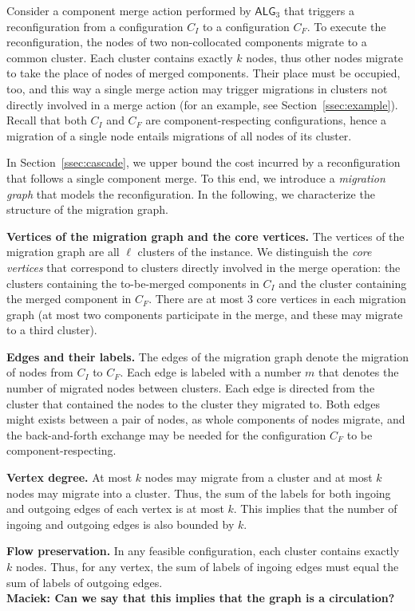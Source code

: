 \documentclass[manuscript,screen=true, review, anonymous]{acmart}
\newcommand{\TAlg}{{\ensuremath{\textsf{ALG}_{3}}}\xspace}
\newcommand\maciek[1]{\color{brown}\textbf{\\ Maciek: #1}\color{black}}
\begin{document}
Consider a component merge action performed by \TAlg that triggers a reconfiguration from a configuration $C_I$ to a configuration $C_F$.
To execute the reconfiguration, the nodes of two non-collocated components migrate to a common cluster.
Each cluster contains exactly $k$ nodes, thus other nodes migrate to take the place of nodes of merged components.
Their place must be occupied, too, and this way a single merge action may trigger migrations in clusters not directly involved in a merge action (for an example, see Section~\ref{ssec:example}). 
Recall that both $C_I$ and $C_F$ are component-respecting configurations, hence a migration of a single node entails migrations of all nodes of its cluster.

In Section~\ref{ssec:cascade}, we upper bound the cost incurred by a reconfiguration that follows a single component merge.
To this end, we introduce a \emph{migration graph} that models the reconfiguration.
In the following, we characterize the structure of the migration graph.

\noindent
\textbf{Vertices of the migration graph and the core vertices.}
The vertices of the migration graph are all $\ell$ clusters of the instance.
We distinguish the \emph{core vertices} that correspond to clusters directly involved in the merge operation: the clusters containing the to-be-merged components in $C_I$ and the cluster containing the merged component in $C_F$.
There are at most $3$ core vertices in each migration graph (at most two components participate in the merge, and these may migrate to a third cluster).

\noindent
\textbf{Edges and their labels.}
The edges of the migration graph denote the migration of nodes from $C_I$ to $C_F$.
Each edge is labeled with a number $m$ that denotes the number of migrated nodes between clusters.
Each edge is directed from the cluster that contained the nodes to the cluster they migrated to.
Both edges might exists between a pair of nodes, as whole components of nodes migrate, and the back-and-forth exchange may be needed for the configuration $C_F$ to be component-respecting.

\noindent
\textbf{Vertex degree.}
At most $k$ nodes may migrate from a cluster and at most $k$ nodes may migrate into a cluster.
Thus, the sum of the labels for both ingoing and outgoing edges of each vertex is at most $k$.
This implies that the number of ingoing and outgoing edges is also bounded by $k$.

\noindent
\textbf{Flow preservation.}
In any feasible configuration, each cluster contains exactly $k$ nodes.
Thus, for any vertex, the sum of labels of ingoing edges must equal the sum of labels of outgoing edges.
\maciek{Can we say that this implies that the graph is a circulation?}
\end{document}
